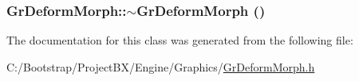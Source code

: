 \hypertarget{class_gr_deform_morph_2e94b7446a5ca2cefed5688eff0b0e0f}{
\subsubsection[{$\sim$GrDeformMorph}]{\setlength{\rightskip}{0pt plus 5cm}GrDeformMorph::$\sim$GrDeformMorph ()}}
\label{class_gr_deform_morph_2e94b7446a5ca2cefed5688eff0b0e0f}




The documentation for this class was generated from the following file:\begin{CompactItemize}
\item 
C:/Bootstrap/ProjectBX/Engine/Graphics/\hyperlink{_gr_deform_morph_8h}{GrDeformMorph.h}\end{CompactItemize}

